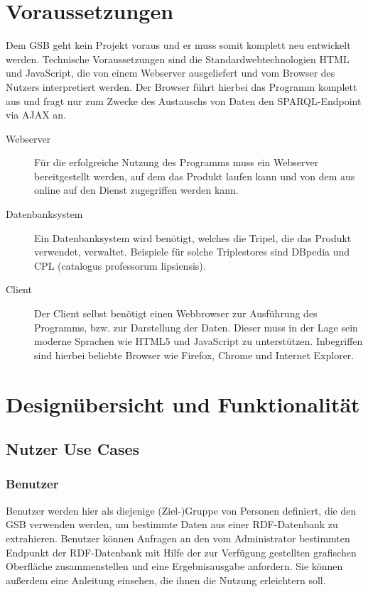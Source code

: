 \section{Voraussetzungen}

Dem GSB geht kein Projekt voraus und er muss somit komplett neu
entwickelt werden.
Technische Voraussetzungen sind die Standardwebtechnologien HTML und
JavaScript, die von einem Webserver ausgeliefert und vom Browser des
Nutzers interpretiert werden.
Der Browser führt hierbei das Programm komplett aus und fragt nur zum Zwecke des Austauschs von Daten den SPARQL-Endpoint via AJAX an. 

\begin{description}
\item[Webserver]
  Für die erfolgreiche Nutzung des Programms muss ein Webserver bereitgestellt   werden, auf dem das Produkt laufen kann und von dem aus online auf den Dienst zugegriffen werden kann.

\item[Datenbanksystem]
  Ein Datenbanksystem wird benötigt, welches die Tripel, die das Produkt verwendet, verwaltet. Beispiele für solche Triplestores sind DBpedia und CPL (catalogus professorum lipsiensis).

\item[Client]
  Der Client selbst benötigt einen Webbrowser zur Ausführung des Programms, bzw. zur Darstellung der Daten. Dieser muss in der Lage sein moderne Sprachen wie HTML5 und JavaScript zu unterstützen. Inbegriffen sind hierbei beliebte Browser wie Firefox, Chrome und Internet Explorer.
\end{description}

\section{Designübersicht und Funktionalität}

\subsection{Nutzer Use Cases}

\subsubsection{Benutzer}

Benutzer werden hier als diejenige (Ziel-)Gruppe von Personen definiert, die den GSB verwenden werden, um bestimmte Daten aus einer RDF-Datenbank zu extrahieren.
Benutzer können Anfragen an den vom Administrator bestimmten Endpunkt der RDF-Datenbank mit Hilfe der zur Verfügung gestellten grafischen Oberfläche zusammenstellen und eine Ergebnisausgabe anfordern. Sie können außerdem eine Anleitung einsehen, die ihnen die Nutzung erleichtern soll.

